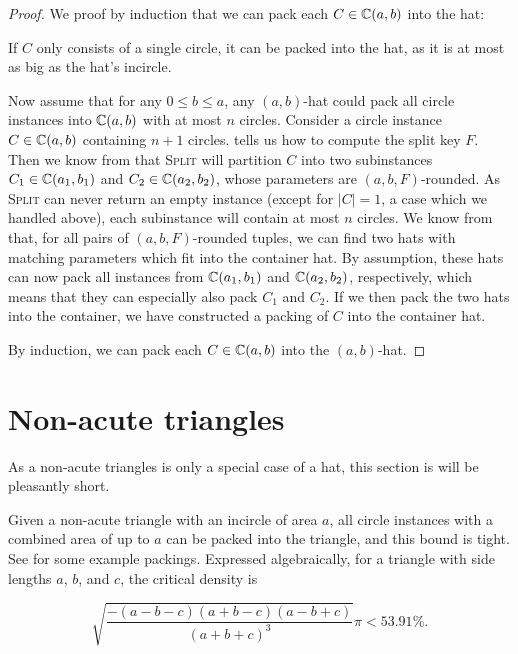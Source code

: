 \documentclass[a4paper,style=print,bibliography=totoc,nexus,lnum,extramargin]{tubsbook}
\begin{document}
\begin{proof}
    We proof by induction that we can pack each $C \in \mathbb{C}(a,b)$ into the hat:

    If $C$ only consists of a single circle, it can be packed into the hat, as it is at most as big as the hat's incircle.

    Now assume that for any $0 \le b \le a$, any $(a,b)$-hat could pack all circle instances into $\mathbb{C}(a,b)$ with at most $n$ circles. Consider a circle instance $C \in \mathbb{C}(a,b)$ containing $n+1$ circles.
     tells us how to compute the split key $F$.
    Then we know from  that \textsc{Split} will partition $C$ into two subinstances $C_1 \in \mathbb{C}(a_1, b_1)$ and $C_2 \in \mathbb{C}(a_2, b_2)$, whose parameters are $(a,b,F)$-rounded. As \textsc{Split} can never return an empty instance (except for $|C| = 1$, a case which we handled above), each subinstance will contain at most $n$ circles. We know from  that, for all pairs of $(a,b,F)$-rounded tuples, we can find two hats with matching parameters which fit into the container hat. By assumption, these hats can now pack all instances from $\mathbb{C}(a_1, b_1)$ and $\mathbb{C}(a_2, b_2)$, respectively, which means that they can especially also pack $C_1$ and $C_2$. If we then pack the two hats into the container, we have constructed a packing of $C$ into the container hat.

    By induction, we can pack each $C \in \mathbb{C}(a,b)$ into the $(a,b)$-hat.
\end{proof}

\section{Non-acute triangles}

As a non-acute triangles is only a special case of a hat, this section is will be pleasantly short.

\begin{theorem}\label{th:tri}
    Given a non-acute triangle with an incircle of area $a$, all circle instances with a combined area of up to $a$ can be packed into the triangle, and this bound is tight.
    See  for some example packings.
    Expressed algebraically, for a triangle with side lengths $a$, $b$, and $c$, the critical density is

    $$\sqrt{\dfrac{-(a-b-c)(a+b-c)(a-b+c)}{(a+b+c)^3}}\pi < 53.91\%.$$
\end{theorem}
\end{document}
